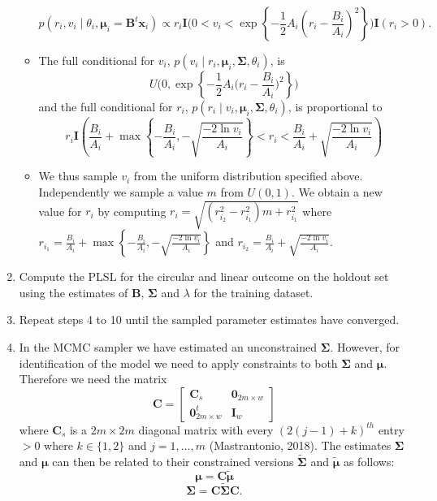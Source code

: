 \documentclass[12pt,]{article}
\begin{document}
\begin{enumerate}
\begin{itemize}
$$p(r_{i}, v_{i}\mid \theta_{i}, \boldsymbol{\mu}_{i}=\boldsymbol{B}^{t}\boldsymbol{x}_{i}) \propto r_{i} \textbf{I}\bigg(0 < v_i < \exp\left\{ -\frac{1}{2}A_i\left(r_{i} - \frac{B_i}{A_i}\right)^2\right\}\bigg)\textbf{I}(r_i > 0).$$
\item The full conditional for $v_{i}$, $p(v_{i} \mid r_{i},\boldsymbol{\mu}_{i}, \boldsymbol{\Sigma}, \theta_{i})$, is
$$U\Bigg(0, \exp\left\{-\frac{1}{2}A_i\bigg(r_i -  \frac{B_{i}}{A_i}\bigg)^2\right\}\Bigg)$$
and the full conditional for $r_i$, $p(r_{i} \mid v_{i},\boldsymbol{\mu}_{i}, \boldsymbol{\Sigma}, \theta_{i})$, is proportional to 
$$r_{i} \textbf{I}\left(\frac{B_i}{A_i} + \max\left\{-\frac{B_i}{A_i}, -\sqrt{\frac{-2\ln v_{i}}{A_i}}\right\} < r_{i} < \frac{B_i}{A_i} + \sqrt{\frac{-2\ln v_{i}}{A_i}}\right)$$
\item We thus sample $v_{i}$ from the uniform distribution specified above. Independently we sample a value $m$ from $U(0,1)$. We obtain a new value for $r_{i}$ by computing $r_{i} = \sqrt{(r_{i_{2}}^{2}-r_{i_{1}}^{2})m + r_{i_{1}}^{2}}$ where $r_{i_{1}}=\frac{B_i}{A_i} +\max\left\{-\frac{B_i}{A_i}, -\sqrt{\frac{-2\ln v_{i}}{A_i}}\right\}$ and $ r_{i_{2}}= \frac{B_i}{A_i} + \sqrt{\frac{-2\ln v_{i}}{A_i}}$.

\end{itemize}

\item Compute the PLSL for the circular and linear outcome on the holdout set using the estimates of $\boldsymbol{B}$, $\boldsymbol{\Sigma}$ and $\lambda$ for the training dataset.

\item Repeat steps 4 to 10 until the sampled parameter estimates have converged.

\item In the MCMC sampler we have estimated an unconstrained $\boldsymbol{\Sigma}$. However, for identification of the model we need to apply  constraints to both $\boldsymbol{\Sigma}$ and $\boldsymbol{\mu}$. Therefore we need the matrix
$$\boldsymbol{C} = \begin{bmatrix} \boldsymbol{C}_s & \boldsymbol{0}_{2m \times w} \\ \boldsymbol{0}_{2m \times w}^t & \boldsymbol{I}_w \end{bmatrix}$$
where $\boldsymbol{C}_s$ is a $2m \times 2m$ diagonal matrix with every $(2(j-1) + k)^{th}$ entry $> 0$ where $k \in \{1,2\}$ and $j = 1, \dots, m$ (Mastrantonio, 2018). The estimates $\boldsymbol{\Sigma}$ and $\boldsymbol{\mu}$ can then be related to their constrained versions $\tilde{\boldsymbol{\Sigma}}$ and $\tilde{\boldsymbol{\mu}}$ as follows:
$$\boldsymbol{\mu} = \boldsymbol{C}\tilde{\boldsymbol{\mu}}$$
$$\boldsymbol{\Sigma} = \boldsymbol{C}\tilde{\boldsymbol{\Sigma}}\boldsymbol{C}.$$

\end{enumerate}
\end{document}
